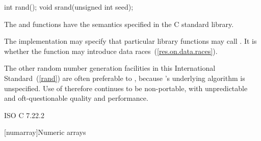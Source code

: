 %
%
\begin{itemdecl}
int rand();
void srand(unsigned int seed);
\end{itemdecl}

\begin{itemdescr}
\pnum
\effects
The
 and 
functions have the semantics specified in the C standard library.

\pnum
\remarks
The implementation
may specify that particular library functions may call
.
It is 
whether the  function
may introduce data races~(\ref{res.on.data.races}).
\begin{note}
%
The other random
number generation facilities in this International Standard~(\ref{rand}) are often preferable
to , because 's underlying algorithm is unspecified.
Use of  therefore continues to be non-portable, with unpredictable
and oft-questionable quality and performance.
\end{note}
\end{itemdescr}

\xref ISO C 7.22.2



[numarray]{Numeric arrays}

